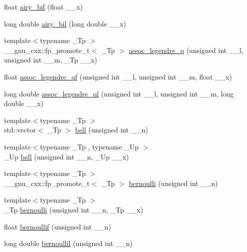 \begin{DoxyCompactItemize}
\item 
float \hyperlink{group__mathsf__gnu_ga2ade465827bdba7370abbcce78e54912}{airy\+\_\+bif} (float \+\_\+\+\_\+x)
\item 
long double \hyperlink{group__mathsf__gnu_ga59240b3f40177e5187f3f194f624f0f8}{airy\+\_\+bil} (long double \+\_\+\+\_\+x)
\item 
{\footnotesize template$<$typename \+\_\+\+Tp $>$ }\\\+\_\+\+\_\+gnu\+\_\+cxx\+::fp\+\_\+promote\+\_\+t$<$ \+\_\+\+Tp $>$ \hyperlink{group__mathsf__gnu_ga96a1223727fa71ffbf520a98ac3dc885}{assoc\+\_\+legendre\+\_\+q} (unsigned int \+\_\+\+\_\+l, unsigned int \+\_\+\+\_\+m, \+\_\+\+Tp \+\_\+\+\_\+x)
\item 
float \hyperlink{group__mathsf__gnu_ga61d651dc8b3c42fe47a02b36e95f72c0}{assoc\+\_\+legendre\+\_\+qf} (unsigned int \+\_\+\+\_\+l, unsigned int \+\_\+\+\_\+m, float \+\_\+\+\_\+x)
\item 
long double \hyperlink{group__mathsf__gnu_ga07a9e571759c6d24e96da8cc8268f91e}{assoc\+\_\+legendre\+\_\+ql} (unsigned int \+\_\+\+\_\+l, unsigned int \+\_\+\+\_\+m, long double \+\_\+\+\_\+x)
\item 
{\footnotesize template$<$typename \+\_\+\+Tp $>$ }\\std\+::vector$<$ \+\_\+\+Tp $>$ \hyperlink{group__mathsf__gnu_gac07286d722248a7f3c65a13b49b1fef5}{bell} (unsigned int \+\_\+\+\_\+n)
\item 
{\footnotesize template$<$typename \+\_\+\+Tp , typename \+\_\+\+Up $>$ }\\\+\_\+\+Up \hyperlink{group__mathsf__gnu_ga1e87244cb33a10de204856cafb19046f}{bell} (unsigned int \+\_\+\+\_\+n, \+\_\+\+Up \+\_\+\+\_\+x)
\item 
{\footnotesize template$<$typename \+\_\+\+Tp $>$ }\\\+\_\+\+\_\+gnu\+\_\+cxx\+::fp\+\_\+promote\+\_\+t$<$ \+\_\+\+Tp $>$ \hyperlink{group__mathsf__gnu_gad339f0011df1967ec6c9e55bd1547bf4}{bernoulli} (unsigned int \+\_\+\+\_\+n)
\item 
{\footnotesize template$<$typename \+\_\+\+Tp $>$ }\\\+\_\+\+Tp \hyperlink{group__mathsf__gnu_ga140e17e038ab0e3875c1b3fad09bc991}{bernoulli} (unsigned int \+\_\+\+\_\+n, \+\_\+\+Tp \+\_\+\+\_\+x)
\item 
float \hyperlink{group__mathsf__gnu_gabcd77f012ae74989c4bb9ca61978481d}{bernoullif} (unsigned int \+\_\+\+\_\+n)
\item 
long double \hyperlink{group__mathsf__gnu_gaac8f04abfdd6b744d11cb73ec1f564b1}{bernoullil} (unsigned int \+\_\+\+\_\+n)

\end{DoxyCompactItemize}

